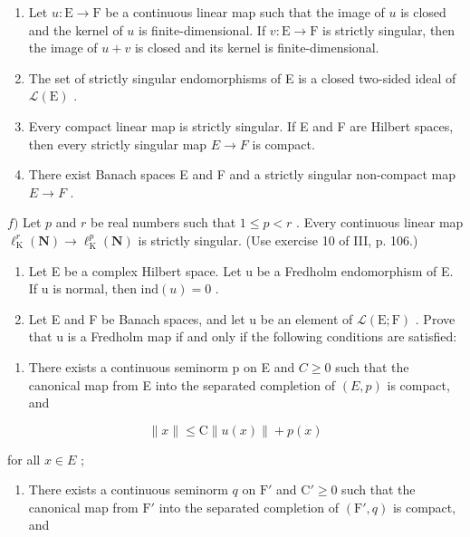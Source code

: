 \begin{enumerate}
\def\labelenumi{\alph{enumi})}
\setcounter{enumi}{1}
\item
  Let \(u \colon \mathrm{E} \to \mathrm{F}\) be a continuous linear map such that the image of \(u\) is closed and the kernel of \(u\) is finite-dimensional. If \(v \colon \mathrm{E} \to \mathrm{F}\) is strictly singular, then the image of \(u + v\) is closed and its kernel is finite-dimensional.
\item
  The set of strictly singular endomorphisms of E is a closed two-sided ideal of \(\mathcal{L}(\mathrm{E})\) .
\item
  Every compact linear map is strictly singular. If E and F are Hilbert spaces, then every strictly singular map \(E \rightarrow F\) is compact.
\item
  There exist Banach spaces E and F and a strictly singular non-compact map \(E \rightarrow F\) .
\end{enumerate}

\(f)\) Let \(p\) and \(r\) be real numbers such that \(1 \leqslant p < r\) . Every continuous linear map \(\ell_{\mathrm{K}}^{r}(\mathbf{N}) \to \ell_{\mathrm{K}}^{p}(\mathbf{N})\) is strictly singular. (Use exercise 10 of III, p. 106.)

\begin{enumerate}
\def\labelenumi{\arabic{enumi})}
\setcounter{enumi}{5}
\item
  Let E be a complex Hilbert space. Let u be a Fredholm endomorphism of E. If u is normal, then \(\text{ind}(u) = 0\) .
\item
  Let E and F be Banach spaces, and let u be an element of \(\mathcal{L}(\mathrm{E};\mathrm{F})\) . Prove that u is a Fredholm map if and only if the following conditions are satisfied:
\end{enumerate}

\begin{enumerate}
\def\labelenumi{(\roman{enumi})}
\tightlist
\item
  There exists a continuous seminorm p on E and \(C \geqslant 0\) such that the canonical map from E into the separated completion of \((E, p)\) is compact, and
\end{enumerate}

\[
\| x \| \leqslant \mathrm{C} \| u (x) \| + p (x)
\]

for all \(x \in E\) ;

\begin{enumerate}
\def\labelenumi{(\roman{enumi})}
\setcounter{enumi}{1}
\tightlist
\item
  There exists a continuous seminorm \(q\) on \(\mathrm{F}'\) and \(\mathrm{C}' \geqslant 0\) such that the canonical map from \(\mathrm{F}'\) into the separated completion of \((\mathrm{F}', q)\) is compact, and
\end{enumerate}

